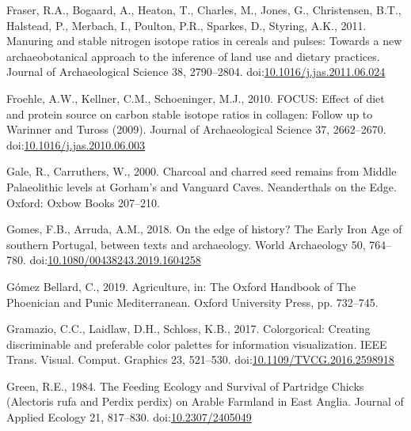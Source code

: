\documentclass[review]{elsarticle} %
\newlength{\cslhangindent}
\newenvironment{CSLReferences}[2] %
 {%
  \setlength{\parindent}{0pt}
  \ifodd #1 \everypar{\setlength{\hangindent}{\cslhangindent}}\ignorespaces\fi
  \ifnum #2 > 0
  \setlength{\parskip}{#2\baselineskip}
  \fi
 }%
 {}
\begin{document}
\begin{CSLReferences}{1}{0}
\leavevmode{}%
Fraser, R.A., Bogaard, A., Heaton, T., Charles, M., Jones, G., Christensen, B.T., Halstead, P., Merbach, I., Poulton, P.R., Sparkes, D., Styring, A.K., 2011. Manuring and stable nitrogen isotope ratios in cereals and pulses: Towards a new archaeobotanical approach to the inference of land use and dietary practices. Journal of Archaeological Science 38, 2790--2804. doi:\href{https://doi.org/10.1016/j.jas.2011.06.024}{10.1016/j.jas.2011.06.024}

\leavevmode{}%
Froehle, A.W., Kellner, C.M., Schoeninger, M.J., 2010. {FOCUS}: Effect of diet and protein source on carbon stable isotope ratios in collagen: Follow up to {Warinner} and {Tuross} (2009). Journal of Archaeological Science 37, 2662--2670. doi:\href{https://doi.org/10.1016/j.jas.2010.06.003}{10.1016/j.jas.2010.06.003}

\leavevmode{}%
Gale, R., Carruthers, W., 2000. Charcoal and charred seed remains from {Middle Palaeolithic} levels at {Gorham}'s and {Vanguard Caves}. Neanderthals on the Edge. Oxford: Oxbow Books 207--210.

\leavevmode{}%
Gomes, F.B., Arruda, A.M., 2018. On the edge of history? {The Early Iron Age} of southern {Portugal}, between texts and archaeology. World Archaeology 50, 764--780. doi:\href{https://doi.org/10.1080/00438243.2019.1604258}{10.1080/00438243.2019.1604258}

\leavevmode{}%
Gómez Bellard, C., 2019. Agriculture, in: The {Oxford Handbook} of {The Phoenician} and {Punic Mediterranean}. {Oxford University Press}, pp. 732--745.

\leavevmode{}%
Gramazio, C.C., Laidlaw, D.H., Schloss, K.B., 2017. Colorgorical: {Creating} discriminable and preferable color palettes for information visualization. IEEE Trans. Visual. Comput. Graphics 23, 521--530. doi:\href{https://doi.org/10.1109/TVCG.2016.2598918}{10.1109/TVCG.2016.2598918}

\leavevmode{}%
Green, R.E., 1984. The {Feeding Ecology} and {Survival} of {Partridge Chicks} ({Alectoris} rufa and {Perdix} perdix) on {Arable Farmland} in {East Anglia}. Journal of Applied Ecology 21, 817--830. doi:\href{https://doi.org/10.2307/2405049}{10.2307/2405049}


\end{CSLReferences}
\end{document}
